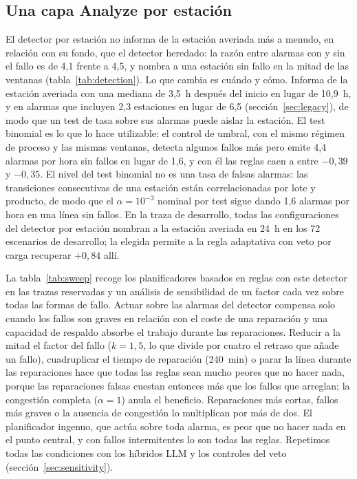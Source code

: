 \documentclass[preprint,11pt]{elsarticle}
\begin{document}
\subsection{Una capa Analyze por estación}
\label{sec:sweep}
El detector por estación no informa de la estación averiada más a menudo, en relación con su fondo, que el detector heredado: la razón entre alarmas con y sin el fallo es de 4{,}1 frente a 4{,}5, y nombra a una estación sin fallo en la mitad de las ventanas (tabla~\ref{tab:detection}). Lo que cambia es cuándo y cómo. Informa de la estación averiada con una mediana de 3{,}5~h después del inicio en lugar de 10{,}9~h, y en alarmas que incluyen 2{,}3 estaciones en lugar de 6{,}5 (sección~\ref{sec:legacy}), de modo que un test de tasa sobre sus alarmas puede aislar la estación. El test binomial es lo que lo hace utilizable: el control de umbral, con el mismo régimen de proceso y las mismas ventanas, detecta algunos fallos más pero emite 4{,}4 alarmas por hora sin fallos en lugar de 1{,}6, y con él las reglas caen a entre $-0{,}39$ y $-0{,}35$. El nivel del test binomial no es una tasa de falsas alarmas: las transiciones consecutivas de una estación están correlacionadas por lote y producto, de modo que el $\alpha=10^{-3}$ nominal por test sigue dando 1{,}6 alarmas por hora en una línea sin fallos. En la traza de desarrollo, todas las configuraciones del detector por estación nombran a la estación averiada en 24~h en los 72 escenarios de desarrollo; la elegida permite a la regla adaptativa con veto por carga recuperar $+0{,}84$ allí.

La tabla~\ref{tab:sweep} recoge los planificadores basados en reglas con este detector en las trazas reservadas y un análisis de sensibilidad de un factor cada vez sobre todas las formas de fallo. Actuar sobre las alarmas del detector compensa solo cuando los fallos son graves en relación con el coste de una reparación y una capacidad de respaldo absorbe el trabajo durante las reparaciones. Reducir a la mitad el factor del fallo ($k=1{,}5$, lo que divide por cuatro el retraso que añade un fallo), cuadruplicar el tiempo de reparación (240~min) o parar la línea durante las reparaciones hace que todas las reglas sean mucho peores que no hacer nada, porque las reparaciones falsas cuestan entonces más que los fallos que arreglan; la congestión completa ($\alpha=1$) anula el beneficio. Reparaciones más cortas, fallos más graves o la ausencia de congestión lo multiplican por más de dos. El planificador ingenuo, que actúa sobre toda alarma, es peor que no hacer nada en el punto central, y con fallos intermitentes lo son todas las reglas. Repetimos todas las condiciones con los híbridos LLM y los controles del veto (sección~\ref{sec:sensitivity}).
\end{document}
